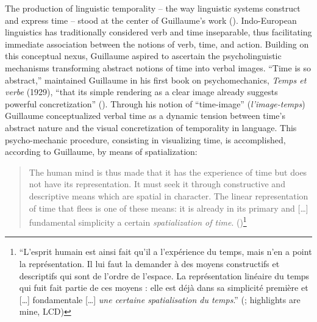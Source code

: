 \documentclass[output=paper]{langsci/langscibook}
\begin{document}
The production of linguistic temporality -- the way linguistic systems construct and express time -- stood at the center of Guillaume’s work (\citealt{joly_problemes_1980}). Indo\nobreakdash-European linguistics has traditionally considered verb and time inseparable, thus facilitating immediate association between the notions of verb, time, and action. Building on this conceptual nexus, Guillaume aspired to ascertain the psycholinguistic mechanisms transforming abstract notions of time into verbal images. “Time is so abstract,” maintained Guillaume in his first book on psychomechanics, \textit{Temps et verbe} (1929), “that its simple rendering as a clear image already suggests powerful concretization” (\citealt[7]{guillaume_temps_1965}). Through his notion of “time-image” (\textit{l’image-temps}) Guillaume conceptualized verbal time as a dynamic tension between time’s abstract nature and the visual concretization of temporality in language. This psycho-mechanic procedure, consisting in visualizing time, is accomplished, according to Guillaume, by means of spatialization:

\begin{quote}
    The human mind is thus made that it has the experience of time but does not have its representation. It must seek it through constructive and descriptive means which are spatial in character. The linear representation of time that flees is one of these means: it is already in its primary and […] fundamental simplicity a certain \textit{spatialization of time}. (\citealt[17]{guillaume_larchitectonique_1965})\footnote{“L'esprit humain est ainsi fait qu'il a l'expérience du temps, mais n'en a point la représentation. Il lui faut la demander à des moyens constructifs et descriptifs qui sont de l'ordre de l'espace. La représentation linéaire du temps qui fuit fait partie de ces moyens : elle est déjà dans sa simplicité première et […] fondamentale […] \textit{une certaine spatialisation du temps}.” (\citealt[17]{guillaume_larchitectonique_1965}; highlights are mine, LCD)}
\end{quote}
\end{document}
